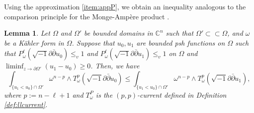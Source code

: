 \documentclass[10pt,a4paper]{amsart}
\numberwithin{equation}{section}
\newtheorem{lem}[equation]{Lemma}
\newcommand{\delb}{\sqrt{-1}\partial\bar{\partial}}
\begin{document}
Using the approximation \ref{item:appP}, we obtain an inequality analogous to the comparison principle for the Monge-Ampère product \cite[Theorem 4.1]{BT}. 


\begin{lem}\label{lem:comp}
    Let $\Omega$ and $\Omega'$ be bounded domains in $\mathbb{C}^n$ such that $\Omega'\subset\subset\Omega$, and $\omega$ be a Kähler form in $\Omega$. Suppose that $u_0,u_1$ are bounded psh functions on $\Omega$ such that $P^{\ell}_\omega(\delb u_0)\le_v1$ and $P^{\ell}_\omega(\delb u_1)\le_v1$ on $\Omega$ and $\liminf_{z\to\partial\Omega'} (u_1-u_0)\ge 0$. Then, we have
    \begin{equation}
        \int_{\{u_1<u_0\}\cap\Omega'}\omega^{n-p}\wedge T^p_\omega(\delb u_0)\le\int_{\{u_1<u_0\}\cap\Omega'}\omega^{n-p}\wedge T^p_\omega(\delb u_1),
    \end{equation}
    where $p:=n-\ell+1$ and $T^P_\omega$ is the $(p,p)$-current defined in Definition \ref{def:llcurrent}.
\end{lem}
\end{document}
